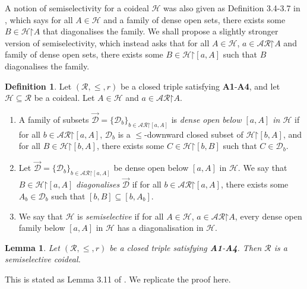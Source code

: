 \documentclass[11pt,reqno]{amsart}
\theoremstyle{plain}
\numberwithin{equation}{section}
\newtheorem{lemma}[theorem]{Lemma}
\theoremstyle{definition}
\newtheorem{definition}[theorem]{Definition}
\newcommand{\cal}{\mathcal}
\newcommand{\restrictedto}{\mathord{\upharpoonright}}
\renewcommand{\H}{\cal{H}}
\newcommand{\D}{\cal{D}}
\begin{document}
A notion of semiselectivity for a coideal $\H$ was also given as Definition 3.4-3.7 in \cite{DMN15}, which says for all $A \in \H$ and a family of dense open sets, there exists some $B \in \H\restrictedto A$ that diagonalises the family. We shall propose a slightly stronger version of semiselectivity, which instead asks that for all $A \in \H$, $a \in \cal{AR}\restrictedto A$ and family of dense open sets, there exists some $B \in \H\restrictedto[a,A]$ such that $B$ diagonalises the family.

\begin{definition}
\label{def:semiselective}
    Let $(\cal{R},\leq,r)$ be a closed triple satisfying \textbf{A1}-\textbf{A4}, and let $\H \subseteq \cal{R}$ be a coideal. Let $A \in \H$ and $a \in \cal{AR}\restrictedto A$.
    \begin{enumerate}
        \item A family of subsets $\vec{\D} = \{\D_b\}_{b \in \cal{AR}\restrictedto[a,A]}$ is \emph{dense open below $[a,A]$ in $\H$} if for all $b \in \cal{AR}\restrictedto[a,A]$, $\D_b$ is a $\leq$-downward closed subset of $\H\restrictedto[b,A]$, and for all $B \in \H\restrictedto[b,A]$, there exists some $C \in \H\restrictedto[b,B]$ such that $C \in \D_b$.
        
        \item Let $\vec{\D} = \{\D_b\}_{b \in \cal{AR}\restrictedto[a,A]}$ be dense open below $[a,A]$ in $\H$. We say that $B \in \H\restrictedto[a,A]$ \emph{diagonalises} $\vec{\D}$ if for all $b \in \cal{AR}\restrictedto[a,A]$, there exists some $A_b \in \D_b$ such that $[b,B] \subseteq [b,A_b]$.

        \item We say that $\H$ is \emph{semiselective} if for all $A \in \H$, $a \in \cal{AR}\restrictedto A$, every dense open family below $[a,A]$ in $\H$ has a diagonalisation in $\H$.
    \end{enumerate}
\end{definition}

\begin{lemma}
    Let $(\cal{R},\leq,r)$ be a closed triple satisfying \textbf{A1}-\textbf{A4}. Then $\cal{R}$ is a semiselective coideal.
\end{lemma}

This is stated as Lemma 3.11 of \cite{Y24}. We replicate the proof here. 
\end{document}
